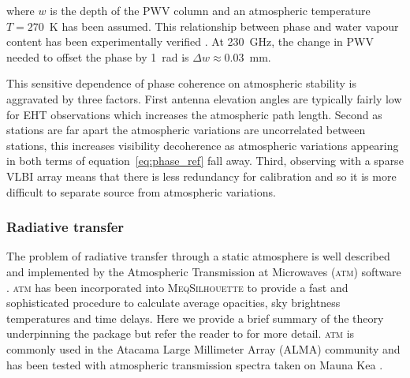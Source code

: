 \noindent where $w$ is the depth of the PWV column \citep*{Carilli_1999} and an atmospheric temperature $T=270$~K has been assumed. This relationship between phase and water vapour content has been experimentally verified \citep{hogg_1981}. At 230~GHz, the change in PWV needed to offset the phase by 1~rad is $\Delta w\approx0.03$~mm. 

This sensitive dependence of phase coherence on atmospheric stability is aggravated by three factors. First antenna elevation angles are typically fairly low for EHT observations which increases the atmospheric path length. Second as stations are far apart the atmospheric variations are uncorrelated between stations, this increases visibility decoherence as atmospheric variations appearing in both terms of equation~\ref{eq:phase_ref} fall away. Third, observing with a sparse VLBI array means that there is less redundancy for calibration and so it is more difficult to separate source from atmospheric variations.


\subsubsection{Radiative transfer}\label{sec:atm_theory}

The problem of radiative transfer through a static atmosphere is well described and implemented by the Atmospheric Transmission at Microwaves (\textsc{atm}) software \citep{Pardo_2001}. \textsc{atm} has been incorporated into \textsc{MeqSilhouette} to provide a fast and sophisticated procedure to calculate average opacities, sky brightness temperatures and time delays. Here we provide a brief summary of the theory underpinning the package but refer the reader to \citet{Pardo_2001} for more detail. \textsc{atm} is commonly used in the Atacama Large Millimeter Array (ALMA) community \citep{Curtis_2009,Nikolic_2013} and has been tested with atmospheric transmission spectra taken on Mauna Kea \citep{Serabyn_1998}.

